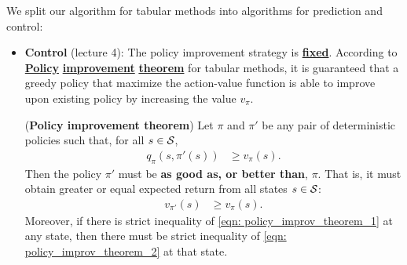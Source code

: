 \documentclass[11pt]{article}
\begin{document}
We split our algorithm for tabular methods into algorithms for prediction and control: 
\begin{itemize}
\item \textbf{Control} (lecture 4): The policy improvement strategy is \underline{\textbf{fixed}}. According to \underline{\textbf{Policy}} \underline{\textbf{improvement}} \underline{\textbf{theorem}} for tabular methods, it is guaranteed that a greedy policy that maximize the action-value function is able to improve upon existing policy by increasing the value $v_{\pi}$. 
\begin{theorem} (\textbf{Policy improvement theorem})
Let $\pi$ and $\pi'$ be any pair of deterministic policies such that, for all $s \in {\mathcal S}$, 
\begin{align}
q_{\pi}(s, \pi'(s)) &\ge v_{\pi}(s). \label{eqn: policy_improv_theorem_1}
\end{align}
Then the policy $\pi'$ must be\textbf{ as good as, or better than}, $\pi$. That is, it must obtain greater or equal expected return from all states $s \in {\mathcal S}$:
\begin{align}
v_{\pi'}(s) &\ge v_{\pi}(s).  \label{eqn: policy_improv_theorem_2}
\end{align} Moreover, if there is strict inequality of \eqref{eqn: policy_improv_theorem_1} at any state, then there must be strict inequality of \eqref{eqn: policy_improv_theorem_2} at that state. 
\end{theorem}



\end{itemize}
\end{document}
